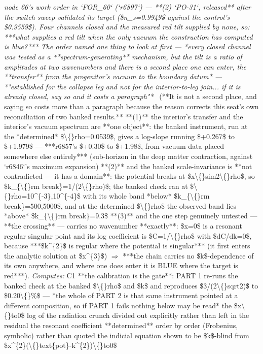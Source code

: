 \begin{description}
\textit{node 66's work order in `FOR\_60` (`r6897`) --- **(2) `PO-31`, released** after the switch sweep validated its target (\$n\_s=0.9949\$ against the control's \$0.9559\$). Four channels closed and the measured red tilt supplied by none, so: ***what supplies a red tilt when the only vacuum the construction has computed is blue?*** The order named one thing to look at first --- *every closed channel was tested as a **spectrum-generating** mechanism, but the tilt is a ratio of amplitudes at two wavenumbers and there is a second place one can enter, the **transfer** from the progenitor's vacuum to the boundary datum* --- *"established for the collapse leg and not for the interior-to-leg join... if it is already closed, say so and it costs a paragraph"*} \ (**It is not a second place, and saying so costs more than a paragraph because the reason corrects this seat's own reconciliation of two banked results.**  **(1)** the interior's transfer and the interior's vacuum spectrum are **one object**: the banked instrument, run at the *determined* \$\textbackslash\{\}rho=0.0539\$, gives a log-slope running \$+0.267\$ to \$+1.979\$ --- ***r6857's \$+0.30\$ to \$+1.98\$, from vacuum data placed somewhere else entirely*** (sub-horizon in the deep matter contraction, against `r6846`'s maximum expansion)   **(2)** and the banked scale-invariance is **not contradicted --- it has a domain**: the potential breaks at \$x\textbackslash\{\}sim2\textbackslash\{\}rho\$, so \$k\_\{\textbackslash\{\}rm break\}=1/(2\textbackslash\{\}rho)\$; the banked check ran at \$\textbackslash\{\}rho=10\textasciicircum{}\{-3\},10\textasciicircum{}\{-4\}\$ with its whole band *below* \$k\_\{\textbackslash\{\}rm break\}=500,5000\$, and at the determined \$\textbackslash\{\}rho\$ the observed band lies *above* \$k\_\{\textbackslash\{\}rm break\}=9.3\$  **(3)** and the one step genuinely untested --- **the crossing** --- carries no wavenumber **exactly**: \$x=0\$ is a resonant regular singular point and its log coefficient is \$C=1/\textbackslash\{\}rho\$ with \$dC/dk=0\$, because ***\$k\textasciicircum{}\{2\}\$ is regular where the potential is singular*** (it first enters the analytic solution at \$x\textasciicircum{}\{3\}\$) \ensuremath{\Rightarrow}  ***the chain carries no \$k\$-dependence of its own anywhere, and where one does enter it is BLUE where the target is red***). 
\emph{Computes:} C1 **the calibration is the gate**: PART 1 re-runs the banked check at the banked \$\textbackslash\{\}rho\$ and \$k\$ and reproduces \$3/(2\textbackslash\{\}sqrt2)\$ to \$0.20\textbackslash\{\}\%\$ --- *the whole of PART 2 is that same instrument pointed at a different composition, so if PART 1 fails nothing below may be read*  the \$x\textbackslash\{\}to0\$ log of the radiation crunch divided out explicitly rather than left in the residual  the resonant coefficient **determined** order by order (Frobenius, symbolic) rather than quoted  the indicial equation shown to be \$k\$-blind from \$x\textasciicircum{}\{2\}(\textbackslash\{\}text\{pot\}-k\textasciicircum{}\{2\})\textbackslash\{\}to0\$

\end{description}
